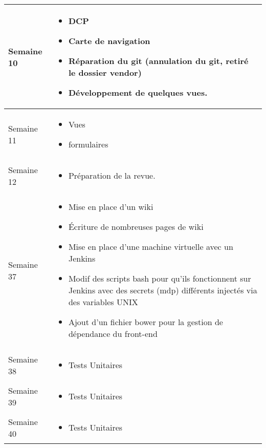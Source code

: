 \documentclass [a4paper] {article}
\begin{document}
\begin{longtable}{|>{\columncolor{gray!40}}p{2cm}|p{12cm}|}
	Semaine 10 & \begin{itemize}
		\item DCP
		\item Carte de navigation
		\item Réparation du git (annulation du git, retiré le dossier vendor)
		\item Développement de quelques vues.	
	\end{itemize} \\
	\hline
	
	Semaine 11 & \begin{itemize}
		\item Vues
		\item formulaires
	\end{itemize} \\
	\hline
	Semaine 12 & \begin{itemize}
	\item Préparation de la revue.
	\end{itemize} \\
	\hline
	
	
	Semaine 37 & \begin{itemize}
	\item Mise en place d'un wiki
	\item Écriture de nombreuses pages de wiki
	\item Mise en place d'une machine virtuelle avec un Jenkins
	\item Modif des scripts bash pour qu'ils fonctionnent sur Jenkins avec des secrets (mdp) différents injectés via des variables UNIX
	\item Ajout d'un fichier bower pour la gestion de dépendance du front-end
	\end{itemize} \\
	\hline
	
	Semaine 38 & \begin{itemize}
	\item Tests Unitaires
	\end{itemize} \\
	\hline

	Semaine 39 & \begin{itemize}
	\item Tests Unitaires
	\end{itemize} \\
	\hline
	
	Semaine 40 & \begin{itemize}
	\item Tests Unitaires
	\end{itemize} \\
	\hline	
	

\end{longtable}
\end{document}
